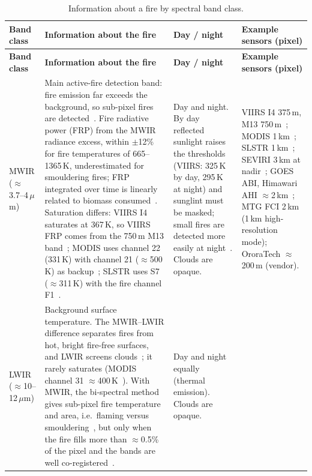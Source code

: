 \documentclass[11pt]{article}
\begin{document}
\begin{longtable}{|p{}|p{}|p{}|p{}|}
\caption{Information about a fire by spectral band class.}\label{tab:sensorcomp}\\
\hline
\rowcolor{tablehead}
\textbf{Band class} & \textbf{Information about the fire} & \textbf{Day / night} & \textbf{Example sensors (pixel)} \\
\hline
\endfirsthead
\hline
\rowcolor{tablehead}
\textbf{Band class} & \textbf{Information about the fire} & \textbf{Day / night} & \textbf{Example sensors (pixel)} \\
\hline
\endhead
\hline
\endfoot
MWIR ($\approx$3.7--4\,$\mu$m) &
Main active-fire detection band: fire emission far exceeds the background, so sub-pixel fires are detected~\cite{giglio2016modis,schroeder2014viirs}. Fire radiative power (FRP) from the MWIR radiance excess, within $\pm$12\% for fire temperatures of 665--1365\,K, underestimated for smouldering fires; FRP integrated over time is linearly related to biomass consumed~\cite{wooster2005frp}. Saturation differs: VIIRS I4 saturates at 367\,K, so VIIRS FRP comes from the 750\,m M13 band~\cite{schroeder2014viirs}; MODIS uses channel 22 (331\,K) with channel 21 ($\approx$500\,K) as backup~\cite{justice2002modis}; SLSTR uses S7 ($\approx$311\,K) with the fire channel F1~\cite{xu2020slstr}. &
Day and night. By day reflected sunlight raises the thresholds (VIIRS: 325\,K by day, 295\,K at night) and sunglint must be masked; small fires are detected more easily at night~\cite{schroeder2014viirs,justice2002modis}. Clouds are opaque. &
VIIRS I4 375\,m, M13 750\,m~\cite{schroeder2014viirs}; MODIS 1\,km~\cite{giglio2016modis}; SLSTR 1\,km~\cite{xu2020slstr}; SEVIRI 3\,km at nadir~\cite{wooster2015seviri}; GOES ABI, Himawari AHI $\approx$2\,km~\cite{schmidt2020goesr}; MTG FCI 2\,km (1\,km high-resolution mode); OroraTech $\approx$200\,m (vendor). \\
\hline
LWIR ($\approx$10--12\,$\mu$m) &
Background surface temperature. The MWIR--LWIR difference separates fires from hot, bright fire-free surfaces, and LWIR screens clouds~\cite{giglio2016modis,schroeder2014viirs}; it rarely saturates (MODIS channel 31 $\approx$400\,K~\cite{justice2002modis}). With MWIR, the bi-spectral method gives sub-pixel fire temperature and area, i.e.\ flaming versus smouldering~\cite{dozier1981}, but only when the fire fills more than $\approx$0.5\% of the pixel and the bands are well co-registered~\cite{wooster2005frp}. &
Day and night equally (thermal emission). Clouds are opaque. &

\end{longtable}
\end{document}
